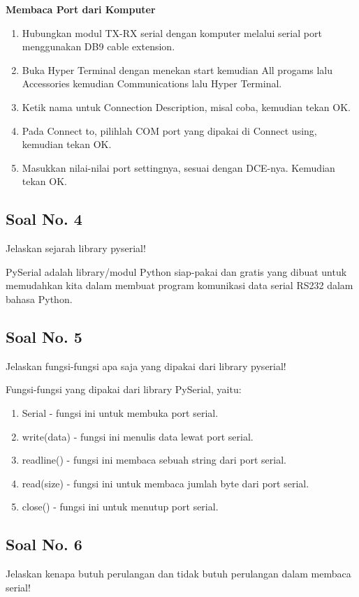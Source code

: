 \hfill \break
\textbf{Membaca Port dari Komputer}

\begin{enumerate}
	\item Hubungkan modul TX-RX serial dengan komputer melalui serial port menggunakan DB9 cable extension.
	\item Buka Hyper Terminal dengan menekan start kemudian All progams lalu Accessories kemudian Communications lalu Hyper Terminal.
	\item Ketik nama untuk Connection Description, misal coba, kemudian tekan OK.
	\item Pada Connect to, pilihlah COM port yang dipakai di Connect using, kemudian tekan OK.
	\item Masukkan nilai-nilai port settingnya, sesuai dengan DCE-nya. Kemudian tekan OK.
\end{enumerate}



\subsection{Soal No. 4}
Jelaskan sejarah library pyserial!

\hfill \break
PySerial adalah library/modul Python siap-pakai dan gratis yang dibuat untuk memudahkan kita dalam membuat program komunikasi data serial RS232 dalam bahasa Python.

\subsection{Soal No. 5}
Jelaskan fungsi-fungsi apa saja yang dipakai dari library pyserial!

\hfill \break
Fungsi-fungsi yang dipakai dari library PySerial, yaitu:
\begin{enumerate}
	\item Serial - fungsi ini untuk membuka port serial.
	\item write(data) - fungsi ini menulis data lewat port serial.
	\item readline() - fungsi ini membaca sebuah string dari port serial.
	\item read(size) - fungsi ini untuk membaca jumlah byte dari port serial.
	\item close() - fungsi ini untuk menutup port serial.
\end{enumerate}

\subsection{Soal No. 6}
Jelaskan kenapa butuh perulangan dan tidak butuh perulangan dalam membaca serial!

